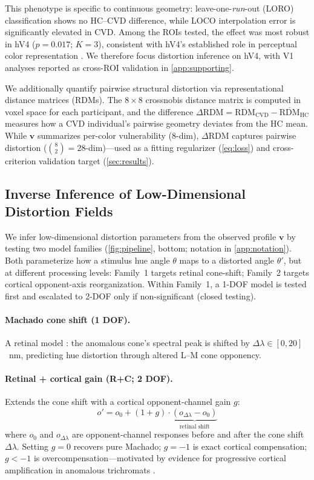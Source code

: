 \documentclass{article}
\begin{document}
This phenotype is specific to continuous geometry: leave-one-\emph{run}-out (LORO) classification shows no HC--CVD difference, while LOCO interpolation error is significantly elevated in CVD.
Among the ROIs tested, the effect was most robust in hV4 ($p = 0.017$; $K{=}3$), consistent with hV4's established role in perceptual color representation \citep{brouwer2009, bannert2018}.
We therefore focus distortion inference on hV4, with V1 analyses reported as cross-ROI validation in \cref{app:supporting}.

We additionally quantify pairwise structural distortion via representational distance matrices (RDMs).
The $8 \times 8$ crossnobis distance matrix is computed in voxel space for each participant, and the difference $\Delta\text{RDM} = \text{RDM}_{\text{CVD}} - \overline{\text{RDM}}_{\text{HC}}$ measures how a CVD individual's pairwise geometry deviates from the HC mean.
While $\mathbf{v}$ summarizes per-color vulnerability (8-dim), $\Delta$RDM captures pairwise distortion ($\binom{8}{2} = 28$-dim)---used as a fitting regularizer (\cref{eq:loss}) and cross-criterion validation target (\cref{sec:results}).

\subsection{Inverse Inference of Low-Dimensional Distortion Fields}

We infer low-dimensional distortion parameters from the observed profile $\mathbf{v}$ by testing two model families (\cref{fig:pipeline}, bottom; notation in \cref{app:notation}).
Both parameterize how a stimulus hue angle $\theta$ maps to a distorted angle $\theta'$, but at different processing levels: Family~1 targets retinal cone-shift; Family~2 targets cortical opponent-axis reorganization.
Within Family~1, a 1-DOF model is tested first and escalated to 2-DOF only if non-significant (closed testing).

\paragraph{Machado cone shift (1 DOF).}
A retinal model \citep{machado2009}: the anomalous cone's spectral peak is shifted by $\Delta\lambda \in [0, 20]$~nm, predicting hue distortion through altered L--M cone opponency.

\paragraph{Retinal + cortical gain (R+C; 2 DOF).}
Extends the cone shift with a cortical opponent-channel gain $g$:
\begin{equation}
o' = o_0 + (1{+}g) \cdot \underbrace{(o_{\Delta\lambda} - o_0)}_{\text{retinal shift}}
\label{eq:rc}
\end{equation}
where $o_0$ and $o_{\Delta\lambda}$ are opponent-channel responses before and after the cone shift $\Delta\lambda$.
Setting $g{=}0$ recovers pure Machado; $g{=}{-}1$ is exact cortical compensation; $g{<}{-}1$ is overcompensation---motivated by evidence for progressive cortical amplification in anomalous trichromats \citep{tregillus2021}.
\end{document}
